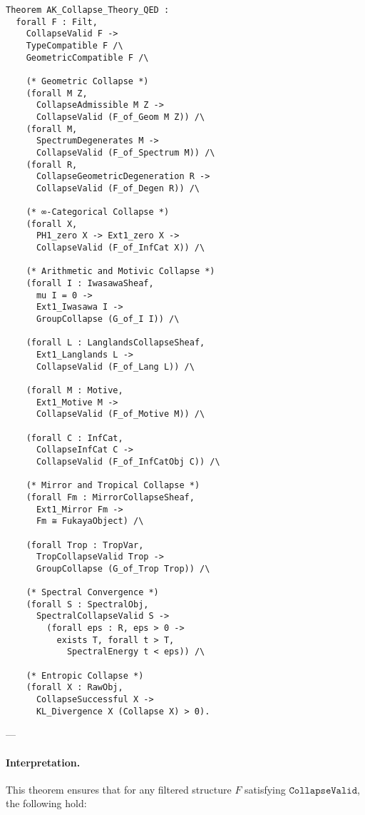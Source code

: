 \documentclass[11pt]{article}
\begin{document}
\begin{lstlisting}[language=Coq]
Theorem AK_Collapse_Theory_QED :
  forall F : Filt,
    CollapseValid F ->
    TypeCompatible F /\
    GeometricCompatible F /\

    (* Geometric Collapse *)
    (forall M Z,
      CollapseAdmissible M Z ->
      CollapseValid (F_of_Geom M Z)) /\
    (forall M,
      SpectrumDegenerates M ->
      CollapseValid (F_of_Spectrum M)) /\
    (forall R,
      CollapseGeometricDegeneration R ->
      CollapseValid (F_of_Degen R)) /\

    (* ∞-Categorical Collapse *)
    (forall X,
      PH1_zero X -> Ext1_zero X ->
      CollapseValid (F_of_InfCat X)) /\

    (* Arithmetic and Motivic Collapse *)
    (forall I : IwasawaSheaf,
      mu I = 0 ->
      Ext1_Iwasawa I ->
      GroupCollapse (G_of_I I)) /\

    (forall L : LanglandsCollapseSheaf,
      Ext1_Langlands L ->
      CollapseValid (F_of_Lang L)) /\

    (forall M : Motive,
      Ext1_Motive M ->
      CollapseValid (F_of_Motive M)) /\

    (forall C : InfCat,
      CollapseInfCat C ->
      CollapseValid (F_of_InfCatObj C)) /\

    (* Mirror and Tropical Collapse *)
    (forall Fm : MirrorCollapseSheaf,
      Ext1_Mirror Fm ->
      Fm ≅ FukayaObject) /\

    (forall Trop : TropVar,
      TropCollapseValid Trop ->
      GroupCollapse (G_of_Trop Trop)) /\

    (* Spectral Convergence *)
    (forall S : SpectralObj,
      SpectralCollapseValid S ->
        (forall eps : R, eps > 0 ->
          exists T, forall t > T,
            SpectralEnergy t < eps)) /\

    (* Entropic Collapse *)
    (forall X : RawObj,
      CollapseSuccessful X ->
      KL_Divergence X (Collapse X) > 0).
\end{lstlisting}

---

\paragraph{Interpretation.}
This theorem ensures that for any filtered structure \( F \) satisfying \( \texttt{CollapseValid} \), the following hold:
\end{document}
